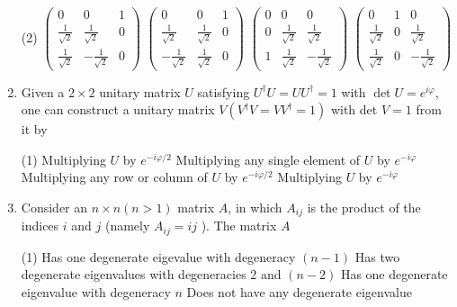 \begin{enumerate}
	 \begin{tasks}(2)
		\task[\textbf{a.}]$\left(\begin{array}{ccc}0 & 0 & 1 \\ \frac{1}{\sqrt{2}} & \frac{1}{\sqrt{2}} & 0 \\ \frac{1}{\sqrt{2}} & -\frac{1}{\sqrt{2}} & 0\end{array}\right)$
		\task[\textbf{b.}]$\left(\begin{array}{ccc}0 & 0 & 1 \\ \frac{1}{\sqrt{2}} & \frac{1}{\sqrt{2}} & 0 \\ -\frac{1}{\sqrt{2}} & \frac{1}{\sqrt{2}} & 0\end{array}\right)$
		\task[\textbf{c.}] $\left(\begin{array}{ccc}0 & 0 & 0 \\ 0 & \frac{1}{\sqrt{2}} & \frac{1}{\sqrt{2}} \\ 1 & \frac{1}{\sqrt{2}} & -\frac{1}{\sqrt{2}}\end{array}\right)$
		\task[\textbf{d.}]  $\left(\begin{array}{ccc}0 & 1 & 0 \\ \frac{1}{\sqrt{2}} & 0 & \frac{1}{\sqrt{2}} \\ \frac{1}{\sqrt{2}} & 0 & -\frac{1}{\sqrt{2}}\end{array}\right)$
	\end{tasks}
	\item Given a $2 \times 2$ unitary matrix $U$ satisfying $U^{\dagger} U=U U^{\dagger}=1$ with $\operatorname{det} U=e^{i \varphi}$, one can construct a unitary matrix $V\left(V^{\dagger} V=V V^{\dagger}=1\right)$ with det $V=1$ from it by
	 \begin{tasks}(1)
		\task[\textbf{a.}] Multiplying $U$ by $e^{-i \varphi / 2}$
		\task[\textbf{b.}] Multiplying any single element of $U$ by $e^{-i \varphi}$
		\task[\textbf{c.}] Multiplying any row or column of $U$ by $e^{-i \varphi / 2}$
		\task[\textbf{d.}]  Multiplying $U$ by $e^{-i \varphi}$
	\end{tasks}
	\item Consider an $n \times n(n>1)$ matrix $A$, in which $A_{i j}$ is the product of the indices $i$ and $j$ (namely $A_{i j}=i j$ ). The matrix $A$
	 \begin{tasks}(1)
		\task[\textbf{a.}]Has one degenerate eigevalue with degeneracy $(n-1)$
		\task[\textbf{b.}]Has two degenerate eigenvalues with degeneracies 2 and $(n-2)$
		\task[\textbf{c.}]Has one degenerate eigenvalue with degeneracy $n$
		\task[\textbf{d.}] Does not have any degenerate eigenvalue

\end{tasks}
\end{enumerate}
